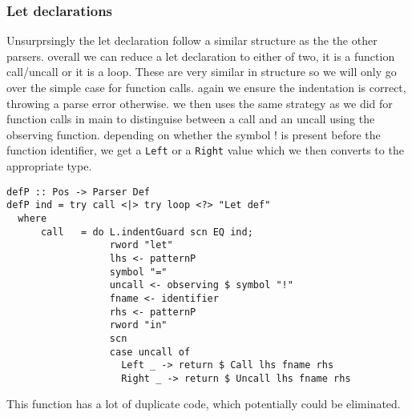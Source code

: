 \documentclass[a4paper]{article}
\begin{document}
\subsubsection{Let declarations}
\label{sec:org584276e}
Unsurprsingly the let declaration follow a similar structure as the the other parsers. overall we can reduce a let declaration to either of two, it is a function call/uncall or it is a loop. These are very similar in structure so we will only go over the simple case for function calls. again we ensure the indentation is correct, throwing a parse error otherwise. we then uses the same strategy as we did for function calls in main to distinguise between a call and an uncall using the observing function. depending on whether the symbol ! is present before the function identifier, we get a \texttt{Left} or a \texttt{Right} value which we then converts to the appropriate type.
\begin{verbatim}
defP :: Pos -> Parser Def
defP ind = try call <|> try loop <?> "Let def"
  where
      call   = do L.indentGuard scn EQ ind;
                  rword "let"
                  lhs <- patternP
                  symbol "="
                  uncall <- observing $ symbol "!"
                  fname <- identifier
                  rhs <- patternP
                  rword "in"
                  scn
                  case uncall of
                    Left _ -> return $ Call lhs fname rhs
                    Right _ -> return $ Uncall lhs fname rhs
\end{verbatim}
This function has a lot of duplicate code, which potentially could be eliminated.
\end{document}
